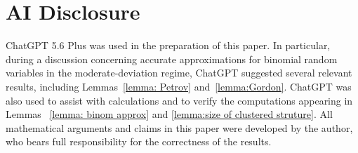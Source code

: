 \documentclass[reqno,11pt]{amsart}
\begin{document}
\section*{AI Disclosure}
ChatGPT 5.6 Plus was used in the preparation of this paper. In particular, during a discussion concerning accurate approximations for binomial random variables in the moderate-deviation regime, ChatGPT suggested several relevant results, including Lemmas~\ref{lemma: Petrov} and~\ref{lemma:Gordon}. ChatGPT was also used to assist with calculations and to verify the computations appearing in Lemmas ~\ref{lemma: binom approx} and \ref{lemma:size of clustered struture}. All mathematical arguments and claims in this paper were developed by the author, who bears full responsibility for the correctness of the results.



\end{document}
